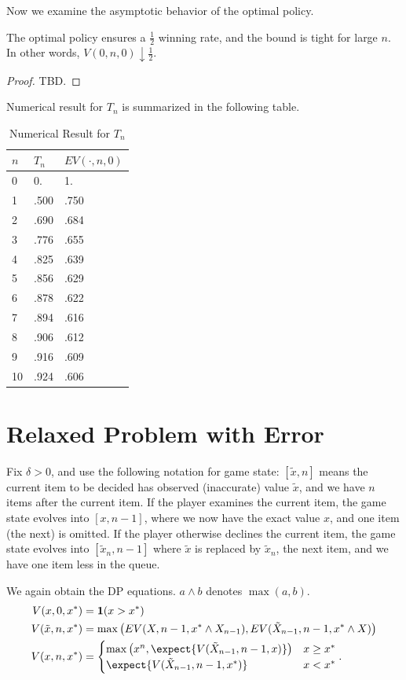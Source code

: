 Now we examine the asymptotic behavior of the optimal policy.

\begin{theorem}
	The optimal policy ensures a $\frac{1}{2}$ winning rate, and the bound is tight for large $n$. In other words, $V(0,n, 0) \downarrow \frac{1}{2}$.
\end{theorem}
\begin{proof}
	TBD.
\end{proof}


Numerical result for $T_n$ is summarized in the following table.

\begin{table}[htpb]
	\centering
	\caption{Numerical Result for  $T_n$}
	\begin{tabular}{l|l|l}
		$n$ & $T_n$ & $EV(\cdot, n, 0)$ \\
		\hline
0 & 0. & 1.\\
1 & .500 & .750\\
2 & .690 & .684\\
3 & .776 & .655\\
4 & .825 & .639\\
5 & .856 & .629\\
6 & .878 & .622\\
7 & .894 & .616\\
8 & .906 & .612\\
9 & .916 & .609\\
10 & .924 & .606 
	\end{tabular}
\end{table}

\section{Relaxed Problem with Error}
Fix $\delta > 0$, and use the following notation for game state: $[\tilde x, n]$ means the current item to be decided has observed (inaccurate) value  $\tilde x$, and we have $n$ items after the current item. 
If the player examines the current item, the game state evolves into $[x, n-1]$, where we now have the exact value $x$, and one item (the next) is omitted. 
If the player otherwise declines the current item, the game state evolves into $[\tilde x_n, n-1]$ where $\tilde x$ is replaced by $\tilde x_n$, the next item, and we have one item less in the queue.

We again obtain the DP equations. $a \wedge b$ denotes $\max(a,b)$.
\begin{align}
	\label{base}	V(x, 0, x^*) &= \textbf{1}(x>x^*)\\
	\label{err_induct}V(\tilde x, n, x^*) &= \max\left( EV(X,n-1, x^* \wedge X_{n-1}), EV(\tilde X_{n-1}, n-1, x^* \wedge X)\right)  \\
	\label{noerr_induct}V(x, n, x^*) &=  \begin{cases}
	\max\left( x^n,  \expect{V(\tilde X_{n-1}, n-1, x)}\right) &x\ge x^*\\
	\expect{V(\tilde X_{n-1}, n-1, x^*)} &x<x^*
	\end{cases}
.\end{align}

